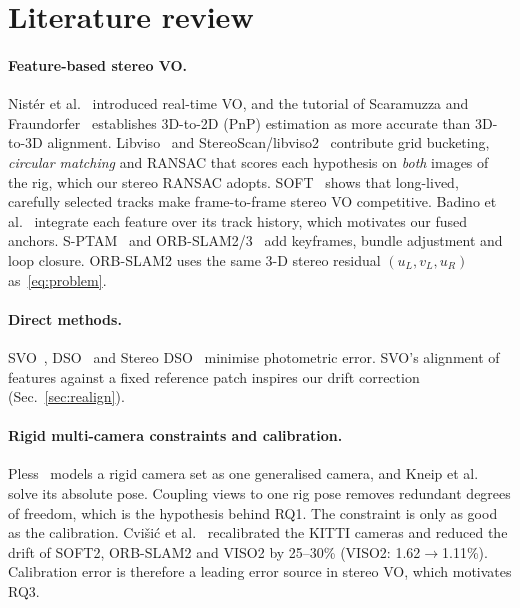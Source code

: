 \documentclass[11pt,a4paper]{article}
\begin{document}
\section{Literature review}\label{sec:lit}
\paragraph{Feature-based stereo VO.} Nist\'er et al.~\cite{nister} introduced real-time VO, and the tutorial of Scaramuzza and Fraundorfer~\cite{vo_tutorial1,vo_tutorial2} establishes 3D-to-2D (PnP) estimation as more accurate than 3D-to-3D alignment. Libviso~\cite{kitt} and StereoScan/libviso2~\cite{stereoscan} contribute grid bucketing, \emph{circular matching} and RANSAC that scores each hypothesis on \emph{both} images of the rig, which our stereo RANSAC adopts. SOFT~\cite{soft} shows that long-lived, carefully selected tracks make frame-to-frame stereo VO competitive. Badino et al.~\cite{badino} integrate each feature over its track history, which motivates our fused anchors. S-PTAM~\cite{sptam} and ORB-SLAM2/3~\cite{orbslam2,orbslam3} add keyframes, bundle adjustment and loop closure. ORB-SLAM2 uses the same 3-D stereo residual $(u_L, v_L, u_R)$ as~\eqref{eq:problem}.

\paragraph{Direct methods.} SVO~\cite{svo}, DSO~\cite{dso} and Stereo DSO~\cite{stereodso} minimise photometric error. SVO's alignment of features against a fixed reference patch inspires our drift correction (Sec.~\ref{sec:realign}).

\paragraph{Rigid multi-camera constraints and calibration.} Pless~\cite{pless} models a rigid camera set as one generalised camera, and Kneip et al.~\cite{npnp} solve its absolute pose. Coupling views to one rig pose removes redundant degrees of freedom, which is the hypothesis behind RQ1. The constraint is only as good as the calibration. Cvi\v{s}i\'c et al.~\cite{recalib} recalibrated the KITTI cameras and reduced the drift of SOFT2, ORB-SLAM2 and VISO2 by 25--30\% (VISO2: 1.62$\to$1.11\%). Calibration error is therefore a leading error source in stereo VO, which motivates RQ3.
\end{document}
